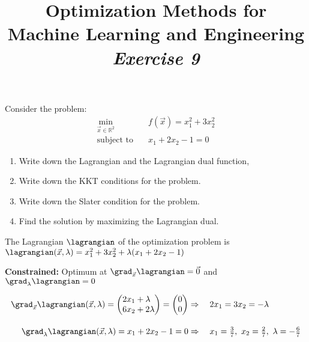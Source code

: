 

\usepackage{multirow}



\author{}
\date{}
\title{Optimization Methods for \\Machine Learning and Engineering\\\vspace{0.5cm}\textit{Exercise 9}}
\maketitle


\setcounter{section}{9}
\setcounter{exercise}{0}


\begin{exercise}[subtitle={Paper}]
Consider the problem:
      \begin{align*}
          \min_{\vec x\in \mathbb R^ 2} \quad & f(\vec x) = x_1^2 + 3 x_2^2\\
          \text{subject to} \quad & x_1+2x_2-1 = 0
      \end{align*}
            \begin{enumerate}[label=\emph{\alph*)}]
\item Write down the Lagrangian and the Lagrangian dual function,
\item Write down the KKT conditions for the problem.
\item Write down the Slater condition for the problem.
\item Find the solution by maximizing the Lagrangian dual.
\end{enumerate}
\end{exercise}

\begin{solution}[print=false]
        The Lagrangian $\lagrangian$ of the optimization problem is
        $\lagrangian(\vec x, \lambda) = x_1^2+ 3x_2^2{} + \lambda(x_1+2x_2-1)$
  
        \textbf{Constrained:} Optimum at $\grad_{\vec x}{\lagrangian} = \vec 0 $ and $ \grad_\lambda{\lagrangian} = 0$


    \begin{align}
        \grad_{\vec x} \lagrangian(\vec x, \lambda) = \begin{pmatrix}
          \begin{aligned}
            2x_1 &+ \lambda\\
           6x_2 &+ 2\lambda
          \end{aligned}
        \end{pmatrix} = \begin{pmatrix} 0\\0 \end{pmatrix}
& \Rightarrow \quad 2x_1= 3x_2 = -\lambda\\[10pt]
        \grad_\lambda \lagrangian(\vec x, \lambda) = x_1+2x_2-1=0 &\Rightarrow \quad x_1 = \tfrac{3}{7},\ x_2 = \tfrac{2}{7},\ \lambda = -\tfrac{6}{7}
      \end{align}
      
\end{solution}

